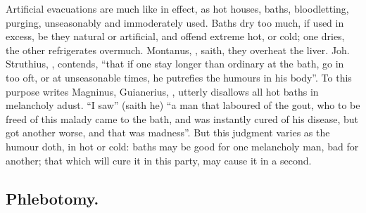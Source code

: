 Artificial evacuations are much like in effect, as hot houses, baths,
bloodletting, purging, unseasonably and immoderately used.
Baths dry too much, if used in excess, be they natural or
artificial, and offend extreme hot, or cold; one dries,
the other refrigerates overmuch. Montanus, ,
saith, they overheat the liver. Joh. Struthius, , contends, \enquote{that if one stay longer
than ordinary at the bath, go in too oft, or at unseasonable times, he
putrefies the humours in his body}. To this purpose writes Magninus,
 Guianerius, , utterly disallows all hot baths in melancholy adust.
\enquote{I saw} (saith he) \enquote{a man that laboured of the gout, who
to be freed of this malady came to the bath, and was instantly cured of his
disease, but got another worse, and that was madness}. But this judgment varies
as the humour doth, in hot or cold: baths may be good for one melancholy man,
bad for another; that which will cure it in this party, may cause it in a
second.

\subsection{Phlebotomy.}

